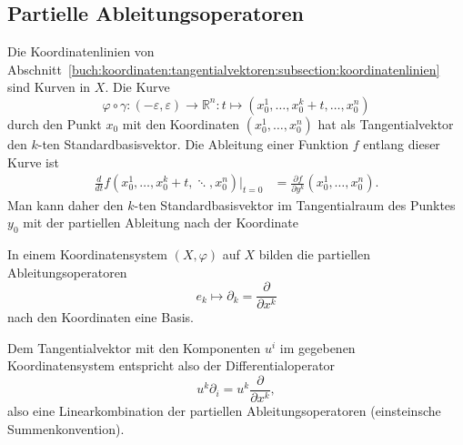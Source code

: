 %
%
\subsection{Partielle Ableitungsoperatoren}
Die Koordinatenlinien von
Abschnitt~\ref{buch:koordinaten:tangentialvektoren:subsection:koordinatenlinien}
sind Kurven in $X$.
Die Kurve
\[
\varphi\circ\gamma
\colon
(-\varepsilon,\varepsilon)
\to
\mathbb{R}^n
:
t\mapsto (x_0^1,\dots,x_0^k+t,\dots,x_0^n)
\]
durch den Punkt $x_0$ mit den Koordinaten $(x_0^1,\dots,x_0^n)$
hat als Tangentialvektor den $k$-ten Standardbasisvektor.
Die Ableitung einer Funktion $f$ entlang dieser Kurve ist
\begin{align*}
\frac{d}{dt}
f(x_0^1,\dots,x_0^k+t,\ddots,x_0^n)
\bigg|_{t=0}
&=
\frac{\partial f}{\partial y^k}(x_0^1,\dots,x_0^n).
\end{align*}
Man kann daher den $k$-ten Standardbasisvektor im Tangentialraum
des Punktes $y_0$ mit der partiellen Ableitung nach der Koordinate

\begin{satz}
In einem Koordinatensystem $(X,\varphi)$ auf $X$ bilden 
die partiellen Ableitungsoperatoren 
\[
e_k
\mapsto
\partial_k = \frac{\partial}{\partial x^k}
\]
nach den Koordinaten eine Basis.
\end{satz}

Dem Tangentialvektor mit den Komponenten $u^i$ im gegebenen
Koordinatensystem entspricht also der Differentialoperator
\[
u^k\partial_i = u^k\frac{\partial}{\partial x^k},
\]
also eine Linearkombination der partiellen Ableitungsoperatoren
(einsteinsche Summenkonvention).


